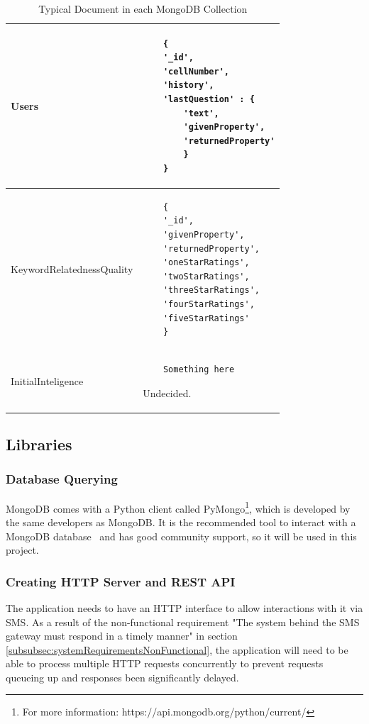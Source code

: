\documentclass[authoryearcitations]{UoYCSproject}
\begin{document}
\begin{table}
\begin{center}
    \begin{tabular}{| l | l |}
    \hline
    
    Users &
    \begin{lstlisting}
    {
    '_id',
    'cellNumber',
    'history',
    'lastQuestion' : {
        'text',
        'givenProperty',
        'returnedProperty'
        }
    }
    \end{lstlisting}
    \\ \hline
    
    KeywordRelatednessQuality &
    \begin{lstlisting}
    {
    '_id',
    'givenProperty',
    'returnedProperty',
    'oneStarRatings',
    'twoStarRatings',
    'threeStarRatings',
    'fourStarRatings',
    'fiveStarRatings'
    }
    \end{lstlisting}
    \\ \hline
    
    InitialInteligence &
    \begin{lstlisting}
    Something here
    \end{lstlisting}
    \color{red} Undecided.
    \\ \hline
    
    \end{tabular}
    \caption{Typical Document in each MongoDB Collection}
    \label{table:collectionStructure}
\end{center}
\end{table}

\subsection{Libraries}
\subsubsection{Database Querying}
MongoDB comes with a Python client called PyMongo\footnote{For more information: https://api.mongodb.org/python/current/}, which is developed by the same developers as MongoDB.  It is the recommended tool to interact with a MongoDB database~\cite{pyMongoDoc} and has good community support, so it will be used in this project.

\subsubsection{Creating HTTP Server and REST API}
The application needs to have an HTTP interface to allow interactions with it via SMS.  As a result of the non-functional requirement "The system behind the SMS gateway must respond in a timely manner" in section \ref{subsubsec:systemRequirementsNonFunctional}, the application will need to be able to process multiple HTTP requests concurrently to prevent requests queueing up and responses been significantly delayed.
\end{document}
